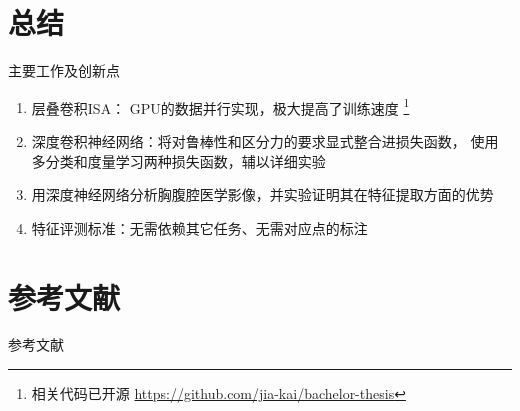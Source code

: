 \documentclass {beamer}
\begin{document}
\section{总结}
\begin{frame}{主要工作及创新点}
    \begin{enumerate}
        \item 层叠卷积ISA：
            GPU的数据并行实现，极大提高了训练速度
            \footnote{相关代码已开源
                \url{https://github.com/jia-kai/bachelor-thesis}}
        \item 深度卷积神经网络：将对鲁棒性和区分力的要求显式整合进损失函数，
            使用多分类和度量学习两种损失函数，辅以详细实验
        \item 用深度神经网络分析胸腹腔医学影像，并实验证明其在特征提取方面的优势
        \item 特征评测标准：无需依赖其它任务、无需对应点的标注
    \end{enumerate}
\end{frame}

\section{ }
\subsection{ }

\section[]{参考文献}

\nocite{bay2006surf}
\nocite{bengio2009learning}
\nocite{bengio2013representation}
\nocite{bergstra+al:2010-scipy}
\nocite{dalal2005histograms}
\nocite{dosovitskiy2014discriminative}
\nocite{he2015delving}
\nocite{heimann2009comparison}
\nocite{hinton2015distilling}
\nocite{hornik1989multilayer}
\nocite{hyvarinen2000emergence}
\nocite{hyvarinen2009natural}
\nocite{kingma2014adam}
\nocite{krizhevsky2012imagenet}
\nocite{kuipers1999quaternions}
\nocite{le2011learning}
\nocite{lecun1998gradient}
\nocite{lowe1999object}
\nocite{medimging2}
\nocite{ojala1994performance}
\nocite{peyrat2010registration}
\nocite{schroff2015facenet}
\nocite{scovanner20073}
\nocite{shen2002hammer}
\nocite{sutskever2013importance}
\nocite{wu2013unsupervised}

\begin{frame}[allowframebreaks]{参考文献}
    \printbibliography
\end{frame}
\end{document}
